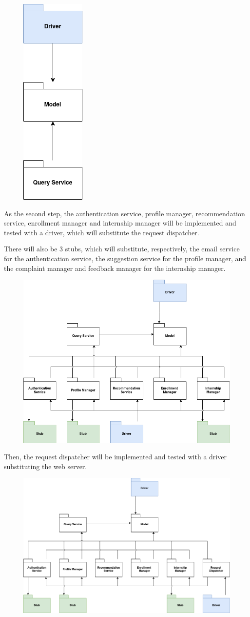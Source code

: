 \begin{figure}[H]
    \centering
    \includegraphics[width=0.1\linewidth]{../assets/implementation-plan-diagrams/implementation-plan-1.png}
\end{figure}

As the second step, the authentication service, profile manager, recommendation service, enrollment manager and internship manager will be implemented and tested with a driver, which will substitute the request dispatcher.

There will also be 3 stubs, which will substitute, respectively, the email service for the authentication service, the suggestion service for the profile manager, and the complaint manager and feedback manager for the internship manager.

\begin{figure}[H]
    \centering
    \includegraphics[width=0.7\linewidth]{../assets/implementation-plan-diagrams/implementation-plan-2.png}
\end{figure}

Then, the request dispatcher will be implemented and tested with a driver substituting the web server.

\begin{figure}[H]
    \centering
    \includegraphics[width=0.8\linewidth]{../assets/implementation-plan-diagrams/implementation-plan-3.png}
\end{figure}

